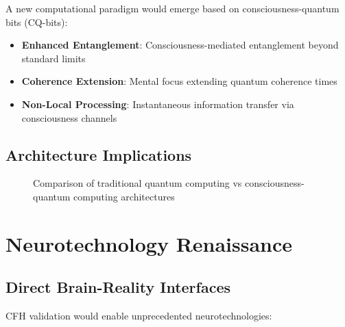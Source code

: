\documentclass[12pt,article]{memoir}
\begin{document}
A new computational paradigm would emerge based on consciousness-quantum bits (CQ-bits):

\begin{itemize}
    \item \textbf{Enhanced Entanglement}: Consciousness-mediated entanglement beyond standard limits
    \item \textbf{Coherence Extension}: Mental focus extending quantum coherence times
    \item \textbf{Non-Local Processing}: Instantaneous information transfer via consciousness channels
\end{itemize}

\subsection{Architecture Implications}

\begin{figure}[h]
\centering
{}
\caption{Comparison of traditional quantum computing vs consciousness-quantum computing architectures}
\end{figure}

\section{Neurotechnology Renaissance}

\subsection{Direct Brain-Reality Interfaces}

CFH validation would enable unprecedented neurotechnologies:
\end{document}
